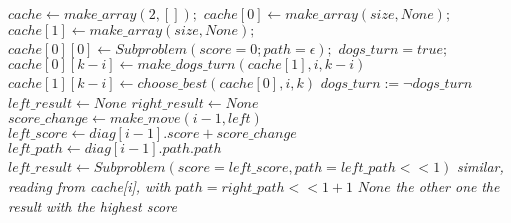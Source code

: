 \documentclass{article}
\begin{document}
\begin{algorithm}[H]
\begin{algorithmic}
\caption{}
\State $cache \leftarrow make\_array(2, []);$
\State $cache[0] \leftarrow make\_array(size, None);$
\State $cache[1] \leftarrow make\_array(size, None);$
\State $cache[0][0] \leftarrow Subproblem(score=0; path=\epsilon);$
\State $dogs\_turn = true;$
            \State $cache[0][k-i] \leftarrow make\_dogs\_turn(cache[1], i, k-i)$
        \EndFor
    \Else 
            \State $cache[1][k-i] \leftarrow choose\_best(cache[0], i, k)$
        \EndFor
    \EndIf
    \State $dogs\_turn := \neg dogs\_turn$
\EndFor
\EndProcedure
\State \\
\State $left\_result \leftarrow None$
\State $right\_result \leftarrow None$
    \State $score\_change \leftarrow make\_move(i-1, left)$
    \State $left\_score \leftarrow  diag[i-1].score + score\_change$
    \State $left\_path \leftarrow diag[i-1].path.path$
    \State $left\_result \leftarrow Subproblem(score=left\_score, path=left\_path<<1)$
\EndIf
{}
    \State \textit{similar, reading from cache[i], with}
    \State $path=right\_path<<1 + 1$
\EndIf
    \State \Return $None$
    \State \Return \textit{the other one}
\Else
    \State \Return \textit{the result with the highest score}
\EndIf
\EndProcedure


\end{algorithmic}
\end{algorithm}
\end{document}
